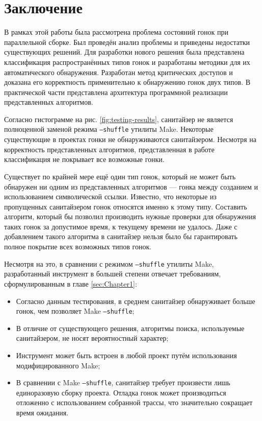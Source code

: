 \section{Заключение}
\label{sec:Chapter5} 


В рамках этой работы была рассмотрена проблема состояний гонок при параллельной сборке. Был проведён анализ проблемы и приведены недостатки существующих решений. Для разработки нового решения была представлена классификация распространённых типов гонок и разработаны методики для их автоматического обнаружения. Разработан метод критических доступов и доказана его корректность применительно к обнаружению гонок двух типов. В практической части представлена архитектура программной реализации представленных алгоритмов.

Согласно гистограмме на рис. \ref{fig:testing-results}, санитайзер не является полноценной заменой режима \texttt{--shuffle} утилиты Make. Некоторые существующие в проектах гонки не обнаруживаются санитайзером. Несмотря на корректность представленных алгоритмов, представленная в работе классификация не покрывает все возможные гонки.

Существует по крайней мере ещё один тип гонок, который не может быть обнаружен ни одним из представленных алгоритмов --- гонка между созданием и использованием символической ссылки. Известно, что некоторые из пропущенных санитайзером гонок относятся именно к этому типу. Составить алгоритм, который бы позволил производить нужные проверки для обнаружения таких гонок за допустимое время, к текущему времени не удалось. Даже с добавлением такого алгоритма в санитайзер нельзя было бы гарантировать полное покрытие всех возможных типов гонок.

Несмотря на это, в сравнении с режимом \texttt{--shuffle} утилиты Make, разработанный инструмент в большей степени отвечает требованиям, сформулированным в главе \ref{sec:Chapter1}:

\begin{itemize}
    \item Согласно данным тестирования, в среднем санитайзер обнаруживает больше гонок, чем позволяет Make \texttt{--shuffle};
    \item В отличие от существующего решения, алгоритмы поиска, используемые санитайзером, не носят вероятностный характер;
    \item Инструмент может быть встроен в любой проект путём использования модифицированного Make;
    \item В сравнении с Make \texttt{--shuffle}, санитайзер требует произвести лишь единоразовую сборку проекта. Отладка гонок может производиться отложенно с использованием собранной трассы, что значительно сокращает время ожидания.
\end{itemize}

